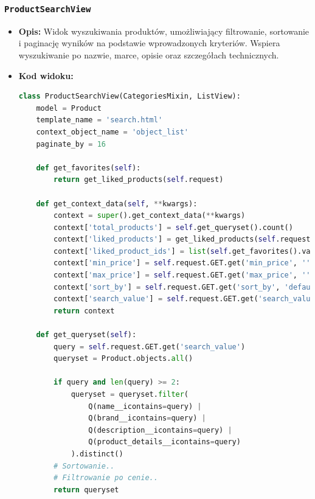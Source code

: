 \documentclass[12pt,a4paper,oneside]{article}
\theoremstyle{definition}
\numberwithin{equation}{section}
\begin{document}
\subsubsection*{\texttt{ProductSearchView}}
\begin{itemize}
    \item \textbf{Opis:} Widok wyszukiwania produktów, umożliwiający filtrowanie, sortowanie i paginację wyników na podstawie wprowadzonych kryteriów. Wspiera wyszukiwanie po nazwie, marce, opisie oraz szczegółach technicznych.
    \item \textbf{Kod widoku:}
    \begin{lstlisting}[language=Python, caption=ProductSearchView]
class ProductSearchView(CategoriesMixin, ListView):
    model = Product
    template_name = 'search.html'
    context_object_name = 'object_list'
    paginate_by = 16

    def get_favorites(self):
        return get_liked_products(self.request)

    def get_context_data(self, **kwargs):
        context = super().get_context_data(**kwargs)
        context['total_products'] = self.get_queryset().count()
        context['liked_products'] = get_liked_products(self.request)
        context['liked_product_ids'] = list(self.get_favorites().values_list('id', flat=True))
        context['min_price'] = self.request.GET.get('min_price', '')
        context['max_price'] = self.request.GET.get('max_price', '')
        context['sort_by'] = self.request.GET.get('sort_by', 'default')
        context['search_value'] = self.request.GET.get('search_value', '')
        return context

    def get_queryset(self):
        query = self.request.GET.get('search_value')
        queryset = Product.objects.all()

        if query and len(query) >= 2:
            queryset = queryset.filter(
                Q(name__icontains=query) |
                Q(brand__icontains=query) |
                Q(description__icontains=query) |
                Q(product_details__icontains=query)
            ).distinct()
        # Sortowanie..
        # Filtrowanie po cenie..
        return queryset
    \end{lstlisting}


\end{itemize}
\end{document}
